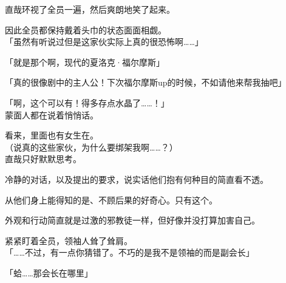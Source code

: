 直哉环视了全员一遍，然后爽朗地笑了起来。

因此全员都保持戴着头巾的状态面面相觑。\\

「虽然有听说过但是这家伙实际上真的很恐怖啊……」

「就是那个啊，现代的夏洛克·福尔摩斯」

「真的很像剧中的主人公！下次福尔摩斯up的时候，不如请他来帮我抽吧」

「啊，这个可以有！得多存点水晶了……！」\\

蒙面人都在说着悄悄话。

看来，里面也有女生在。\\

（说真的这些家伙，为什么要绑架我啊……？）\\

直哉只好默默思考。

冷静的对话，以及提出的要求，说实话他们抱有何种目的简直看不透。

从他们身上能得知的是、不顾后果的好奇心。只有这个。

外观和行动简直就是过激的邪教徒一样，但好像并没打算加害自己。

紧紧盯着全员，领袖人耸了耸肩。\\

「……不过，有一点你猜错了。不巧的是我不是领袖的而是副会长」

「蛤……那会长在哪里」

